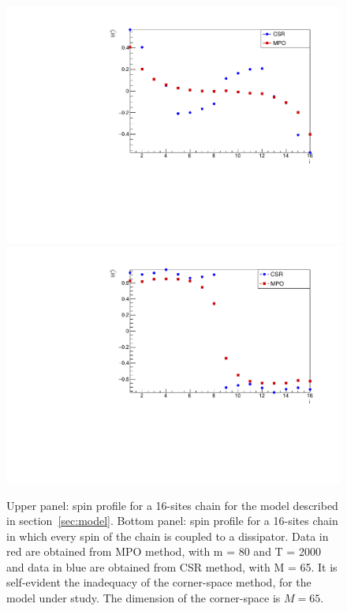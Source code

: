 \begin{figure}[H]
    \centering
    \includegraphics[scale=0.6]{Figures/16sites/LMComparison16s1051.pdf}
    \includegraphics[scale=0.6]{Figures/8U8D_comparisonCSRvsMPO.pdf}
    \captionsetup{width=1.\linewidth}
    \caption{Upper panel: spin profile for a 16-sites chain for the model described in section~\ref{sec:model}. Bottom panel: spin profile for a 16-sites chain in which every spin of the chain is coupled to a dissipator. Data in red are obtained from MPO method, with m = 80 and T = 2000 and data in blue are obtained from CSR method, with M = 65. It is self-evident the inadequacy of the corner-space method, for the model under study. The dimension of the corner-space is $M=65$.}
    \label{fig:LMComparison16s1051}
\end{figure}

